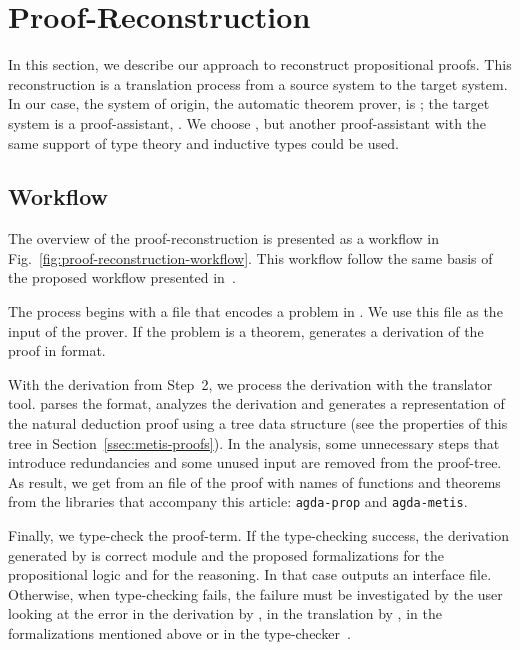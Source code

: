 \documentclass[../main.tex]{subfiles}
\begin{document}

\section{Proof-Reconstruction}
\label{sec:proof-reconstruction}

In this section, we describe our approach to reconstruct
propositional proofs. This reconstruction is a translation
process from a source system to the target system.
In our case, the system of origin, the automatic theorem prover, is
\Metis; the target system is a proof-assistant, \Agda. We choose
\Agda, but another proof-assistant with the same support of type
theory and inductive types could be used.

\subsection{Workflow}
\label{ssec:workflow}


The overview of the proof-reconstruction is presented as a workflow
in Fig.~\ref{fig:proof-reconstruction-workflow}. This workflow
follow the same basis of the proposed workflow presented
in~\cite{sultana2015}.

The process begins with a \TPTP file that encodes a problem in \CPL.
We use this file as the input of the \Metis prover. If the problem is
a theorem, \Metis generates a derivation of the proof in \TSTP
format.

With the \TSTP derivation from Step~2, we process the derivation with the
\Athena translator tool.
\Athena parses the \TSTP format, analyzes the
derivation and generates a representation of the natural deduction
proof using a tree data structure (see the properties
of this tree in Section~\ref{ssec:metis-proofs}).
In the \Athena analysis, some unnecessary steps that introduce redundancies
and some unused input are removed from the proof-tree.
As result, we get from \Athena an \Agda file of the proof
with names of functions and theorems from
the \Agda libraries that accompany this article:
\texttt{agda-prop} and \texttt{agda-metis}.

Finally, we type-check the \Agda proof-term. If the type-checking
success, the \TSTP derivation generated by \Metis is correct
module \Agda and the proposed formalizations for the
propositional logic and for the \Metis reasoning.
In that case \Agda outputs an interface file.
Otherwise, when type-checking fails, the failure must be
investigated by the user looking at the error in the \TSTP derivation
by \Metis, in the translation by \Athena, in the \Agda formalizations
mentioned above or in the type-checker~\Agda.
\end{document}

